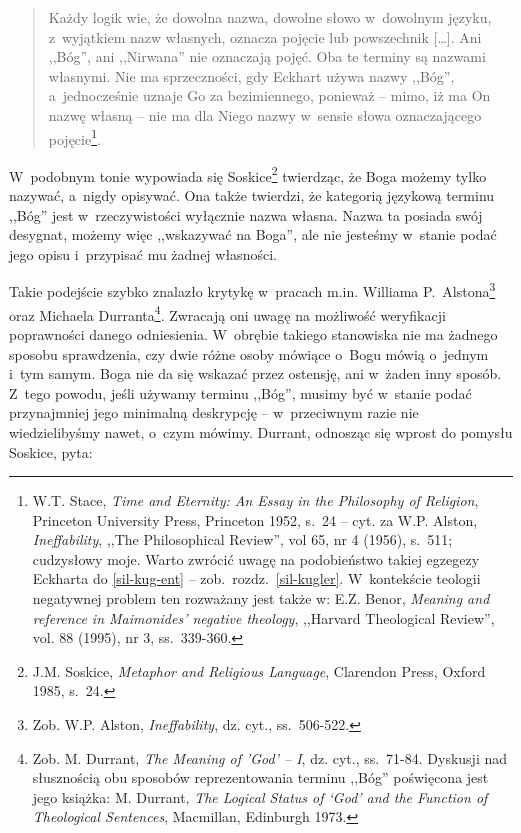 \begin{quote}
Każdy logik wie, że dowolna nazwa, dowolne słowo w~dowolnym języku, z~wyjątkiem nazw własnych, oznacza pojęcie lub powszechnik [\ldots]. Ani ,,Bóg'', ani ,,Nirwana'' nie oznaczają pojęć. Oba te terminy są nazwami własnymi. Nie ma sprzeczności, gdy Eckhart używa nazwy ,,Bóg'', a~jednocześnie uznaje Go za bezimiennego, ponieważ -- mimo, iż ma On nazwę własną -- nie ma dla Niego nazwy w~sensie słowa oznaczającego pojęcie\footnote{W.T. Stace, \textit{Time and Eternity: An Essay in the Philosophy of Religion}, Princeton University Press, Princeton 1952, s.~24 -- cyt. za W.P. Alston, \textit{Ineffability}, ,,The Philosophical Review'', vol 65, nr 4 (1956), s.~511; cudzysłowy moje. Warto zwrócić uwagę na podobieństwo takiej egzegezy Eckharta do \ref{sil-kug-ent} -- zob.~rozdz.~\ref{sil-kugler}. W~kontekście teologii negatywnej problem ten rozważany jest także w: E.Z. Benor, \textit{Meaning and reference in Maimonides' negative theology}, ,,Harvard Theological Review'', vol. 88 (1995), nr 3, ss.~339-360.}.
\end{quote}

W~podobnym tonie wypowiada się Soskice\footnote{J.M. Soskice, \textit{Metaphor and Religious Language}, Clarendon Press, Oxford 1985, s.~24.} twierdząc, że Boga możemy tylko nazywać, a~nigdy opisywać. Ona także twierdzi, że kategorią językową terminu ,,Bóg'' jest w~rzeczywistości wyłącznie nazwa własna. Nazwa ta posiada swój desygnat, możemy więc ,,wskazywać na Boga'', ale nie jesteśmy w~stanie podać jego opisu i~przypisać mu żadnej własności.

Takie podejście szybko znalazło krytykę w~pracach m.in. Williama P.~Alstona\footnote{Zob. W.P. Alston, \textit{Ineffability}, dz. cyt., ss.~506-522.} oraz Michaela Durranta\footnote{Zob. M. Durrant, \textit{The Meaning of 'God' -- I},
dz. cyt.,
ss.~71-84. Dyskusji nad słusznością obu sposobów reprezentowania terminu ,,Bóg'' poświęcona jest jego książka: M. Durrant, \textit{The Logical Status of ‘God' and the Function of Theological Sentences}, Macmillan, Edinburgh 1973.}. Zwracają oni uwagę na możliwość weryfikacji poprawności danego odniesienia. W~obrębie takiego stanowiska nie ma żadnego sposobu sprawdzenia, czy dwie różne osoby mówiące o~Bogu mówią o~jednym i~tym samym. Boga nie da się wskazać przez ostensję, ani w~żaden inny sposób. Z~tego powodu, jeśli używamy terminu ,,Bóg'', musimy być w~stanie podać przynajmniej jego minimalną deskrypcję -- w~przeciwnym razie nie wiedzielibyśmy nawet, o~czym mówimy. Durrant, odnosząc się wprost do pomysłu Soskice, pyta:

